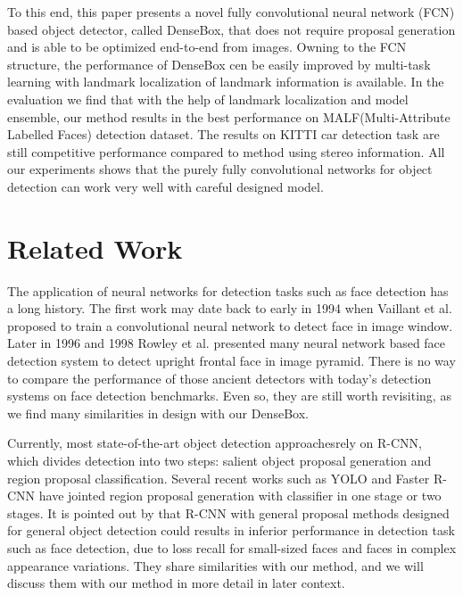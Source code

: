 To this end, this paper presents a novel fully convolutional neural network (FCN)\cite{long2014fully} based object detector, called DenseBox, that does not require proposal generation and is able to be optimized end-to-end from images.  Owning to the FCN structure,  the performance of DenseBox cen be easily improved by multi-task learning with landmark localization of landmark information is available.  In the evaluation we find that with the help of landmark localization and model ensemble, our method results in the best performance on MALF(Multi-Attribute Labelled Faces)\cite{faceevaluation15} detection dataset. The results on KITTI\cite{Geiger2012CVPR} car detection task are still competitive performance compared to method using stereo information. All our experiments shows that the purely fully convolutional networks for object detection can work very well with careful designed model. 

\section{Related Work}

 


The application of neural networks for detection tasks such as face detection has a long history. The first work may date back to early in 1994 when Vaillant et al.\cite{vaillant1994original} proposed to train a convolutional neural network to detect face in image window.  Later in 1996 and 1998 Rowley et al.\cite{rowley1998neural,rowley1998rotation} presented many neural network based face detection system to detect upright frontal face in image pyramid. There is no way to compare the performance of those ancient detectors with today’s detection systems on face detection benchmarks. Even so, they are still worth revisiting, as we find many similarities in design with our DenseBox. 

Currently, most state-of-the-art object detection approaches\cite{ouyang2014deepid, li2015convolutional, erhan2014scalable,girshick2015fast}rely on R-CNN, which divides detection into two steps: salient object proposal generation and region proposal classification. Several recent works such as YOLO and Faster R-CNN have jointed region proposal generation with classifier in one stage or two stages. It is pointed out by \cite{farfade2015multi} that R-CNN with general proposal methods designed for general object detection could results in inferior performance in detection task such as face detection, due to loss recall for small-sized faces and faces in complex appearance variations. They share similarities with our method, and we will discuss them with our method in more detail in later context.  
 
